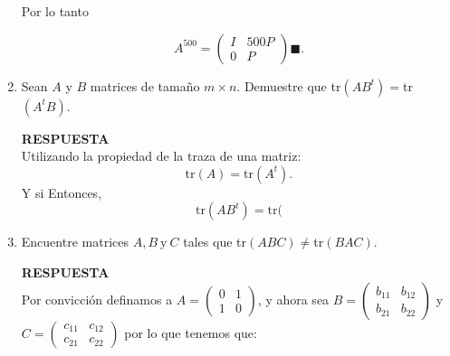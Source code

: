 \documentclass[11pt,letterpaper]{article}
\newcommand{\res}{\textbf{RESPUESTA}\\}
\newcommand{\finf}{\blacksquare.}
\newcommand{\tr}{\text{tr}}
\begin{document}
\begin{enumerate}
Por lo tanto 

\begin{equation*}
A^{500}=\left(\begin{array}{cc}
I& 500P\\
0&P
\end{array}
\right) \finf
\end{equation*}

\item Sean $A$ y $B$ matrices de tamaño $m\times n$. Demuestre que tr$(AB^t)=$tr$(A^tB)$. 

\res
Utilizando la propiedad de la traza de una matriz:
$$\tr(A)=\tr(A^t).$$
Y si 
Entonces,
$$\tr(AB^t)=\tr($$
\item Encuentre matrices $A, B \ \text{y} \ C$ tales que tr$(ABC)\neq$tr$(BAC)$.

\res
Por convicción definamos a $A=\left( \begin{array}{cc}
0&1 \\
1&0
\end{array} \right)$, y ahora sea $B=\left( \begin{array}{cc}
b_{11}&b_{12} \\
b_{21}&b_{22}
\end{array} \right)$ y $C=\left( \begin{array}{cc}
c_{11}&c_{12} \\
c_{21}&c_{22}
\end{array} \right)$ por lo que tenemos que:


\end{enumerate}
\end{document}
